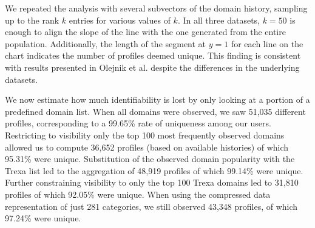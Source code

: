 \documentclass[letterpaper,twocolumn,10pt]{article}
\begin{document}
We repeated the analysis with several subvectors of the domain history, sampling up to the rank $k$ entries for various values of $k$. 
In all three datasets, $k=50$ is enough to align the slope of the line with the one generated from the entire population.
Additionally, the length of the segment at $y=1$ for each line on the chart indicates the number of profiles deemed unique.
This finding is consistent with results presented in Olejnik et al. despite the differences in the underlying datasets.

We now estimate how much identifiability is lost by only looking at a portion of a predefined domain list.
When all domains were observed, we saw 51,035 different profiles, corresponding to a 99.65\% rate of uniqueness among our users.
Restricting to visibility only the top 100 most frequently observed domains allowed us to compute 36,652 profiles (based on available histories) of which 95.31\% were unique.
Substitution of the observed domain popularity with the Trexa list led to the aggregation of 48,919 profiles of which 99.14\% were unique. 
Further constraining visibility to only the top 100 Trexa domains led to 31,810 profiles of which 92.05\% were unique.
When using the compressed data representation of just 281 categories, we still observed 43,348 profiles, of which 97.24\% were unique. 
\end{document}
